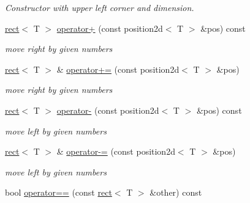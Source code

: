 \begin{DoxyCompactItemize}
\begin{DoxyCompactList}\small\item\em Constructor with upper left corner and dimension. \end{DoxyCompactList}\item 
\hyperlink{classirr_1_1core_1_1rect}{rect}$<$ T $>$ \hyperlink{classirr_1_1core_1_1rect_a699b98aff4bf8b7d92cef6d3c940354f}{operator+} (const position2d$<$ T $>$ \&pos) const \hypertarget{classirr_1_1core_1_1rect_a699b98aff4bf8b7d92cef6d3c940354f}{}\label{classirr_1_1core_1_1rect_a699b98aff4bf8b7d92cef6d3c940354f}

\begin{DoxyCompactList}\small\item\em move right by given numbers \end{DoxyCompactList}\item 
\hyperlink{classirr_1_1core_1_1rect}{rect}$<$ T $>$ \& \hyperlink{classirr_1_1core_1_1rect_a4f4f1c3c3321d1ca5e9f617ebf47421c}{operator+=} (const position2d$<$ T $>$ \&pos)\hypertarget{classirr_1_1core_1_1rect_a4f4f1c3c3321d1ca5e9f617ebf47421c}{}\label{classirr_1_1core_1_1rect_a4f4f1c3c3321d1ca5e9f617ebf47421c}

\begin{DoxyCompactList}\small\item\em move right by given numbers \end{DoxyCompactList}\item 
\hyperlink{classirr_1_1core_1_1rect}{rect}$<$ T $>$ \hyperlink{classirr_1_1core_1_1rect_a031c021cf1ccbc4efe5b5242e85cdc6d}{operator-\/} (const position2d$<$ T $>$ \&pos) const \hypertarget{classirr_1_1core_1_1rect_a031c021cf1ccbc4efe5b5242e85cdc6d}{}\label{classirr_1_1core_1_1rect_a031c021cf1ccbc4efe5b5242e85cdc6d}

\begin{DoxyCompactList}\small\item\em move left by given numbers \end{DoxyCompactList}\item 
\hyperlink{classirr_1_1core_1_1rect}{rect}$<$ T $>$ \& \hyperlink{classirr_1_1core_1_1rect_a3ef4f6f13ec79c3d5745df3a76f9e1e1}{operator-\/=} (const position2d$<$ T $>$ \&pos)\hypertarget{classirr_1_1core_1_1rect_a3ef4f6f13ec79c3d5745df3a76f9e1e1}{}\label{classirr_1_1core_1_1rect_a3ef4f6f13ec79c3d5745df3a76f9e1e1}

\begin{DoxyCompactList}\small\item\em move left by given numbers \end{DoxyCompactList}\item 
bool \hyperlink{classirr_1_1core_1_1rect_ae788c2c726f187fc4681f9ca6eef2b19}{operator==} (const \hyperlink{classirr_1_1core_1_1rect}{rect}$<$ T $>$ \&other) const \hypertarget{classirr_1_1core_1_1rect_ae788c2c726f187fc4681f9ca6eef2b19}{}\label{classirr_1_1core_1_1rect_ae788c2c726f187fc4681f9ca6eef2b19}


\end{DoxyCompactItemize}
